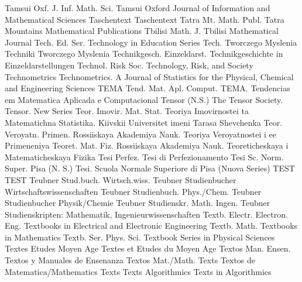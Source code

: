 {Tamsui Oxf. J. Inf. Math. Sci.}
{Tamsui Oxford Journal of Information and Mathematical Sciences}
{Taschentext}
{Taschentext}
{Tatra Mt. Math. Publ.}
{Tatra Mountains Mathematical Publications}
{Tbilisi Math. J.}
{Tbilisi Mathematical Journal}
{Tech. Ed. Ser.}
{Technology in Education Series}
{Tech. Tworczego Myslenia}
{Techniki Tworczego Myslenia}
{Technikgesch. Einzeldarst.}
{Technikgeschichte in Einzeldarstellungen}
{Technol. Risk Soc.}
{Technology, Risk, and Society}
{Technometrics}
{Technometrics. A Journal of Statistics for the Physical, Chemical and Engineering Sciences}
{TEMA Tend. Mat. Apl. Comput.}
{TEMA. Tendencias em Matematica Aplicada e Computacional}
{Tensor (N.S.)}
{The Tensor Society. Tensor. New Series}
{Teor. Imovir. Mat. Stat.}
{Teoriya Imovirnostei ta Matematichna Statistika. Kiivskii Universitet imeni Tarasa Shevchenka}
{Teor. Veroyatn. Primen.}
{Rossiiskaya Akademiya Nauk. Teoriya Veroyatnostei i ee Primeneniya}
{Teoret. Mat. Fiz.}
{Rossiiskaya Akademiya Nauk. Teoreticheskaya i Matematicheskaya Fizika}
{Tesi Perfez.}
{Tesi di Perfezionamento}
{Tesi Sc. Norm. Super. Pisa (N. S.)}
{Tesi. Scuola Normale Superiore di Pisa (Nuova Series)}
{TEST}
{TEST}
{Teubner Stud.buch. Wirtsch.wiss.}
{Teubner Studienbucher Wirtschaftswissenschaften}
{Teubner Studienbuch. Phys./Chem.}
{Teubner Studienbucher Physik/Chemie}
{Teubner Studienskr. Math. Ingen.}
{Teubner Studienskripten: Mathematik, Ingenieurwissenschaften}
{Textb. Electr. Electron. Eng.}
{Textbooks in Electrical and Electronic Engineering}
{Textb. Math.}
{Textbooks in Mathematics}
{Textb. Ser. Phys. Sci.}
{Textbook Series in Physical Sciences}
{Textes Etudes Moyen Age}
{Textes et Etudes du Moyen Age}
{Textos Man. Ensen.}
{Textos y Manuales de Ensenanza}
{Textos Mat./Math. Texts}
{Textos de Matematica/Mathematics Texts}
{Texts Algorithmics}
{Texts in Algorithmics}
